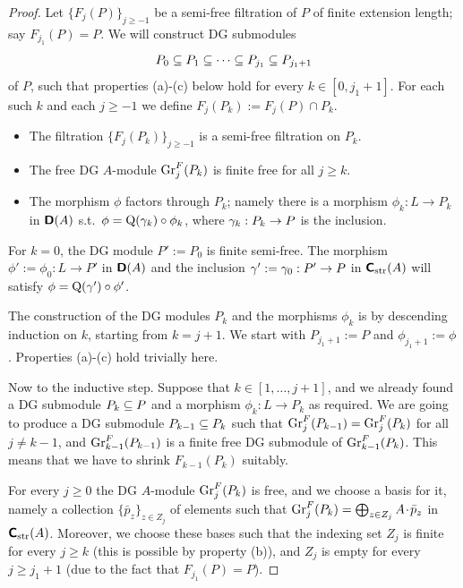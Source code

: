 \begin{proof}
Let $\{ F_j(P) \}_{j \geq -1}$ be a semi-free filtration of $P$ of finite 
extension length; say $F_{j_1}(P) = P$. We will construct DG submodules
\[ P_0 \subseteq P_1 \subseteq \cdots \subseteq P_{j_1} \subseteq P_{j_1 + 1} \]
of $P$, such that properties (a)-(c) below hold for every 
$k \in [0, j_1 + 1]$. For each such $k$ and each $j \geq -1$ we define  
$F_j(P_k) := F_j(P) \cap P_k$.
\begin{itemize}
\item[(a)] The filtration $\{ F_j(P_k) \}_{j \geq -1}$ is a semi-free 
filtration on $P_k$.

\item[(b)] The free DG $A$-module $\operatorname{Gr}^F_j(P_k)$ is finite free for all 
$j \geq k$. 

\item[(c)] The morphism $\phi$ factors through $P_k$; namely there is a 
morphism $\phi_k : L \to P_k$ in $\boldsymbol{\mathsf{D}}(A)$ s.t.\ 
$\phi = \operatorname{Q}(\gamma_k) \circ \phi_k$, where $\gamma_k : P_k \to P$ is the 
inclusion. 
\end{itemize}

For $k = 0$, the DG module $P' := P_0$ is finite semi-free. The morphism 
$\phi' := \phi_0 : L \to P'$
in $\boldsymbol{\mathsf{D}}(A)$ and the inclusion 
$\gamma' := \gamma_0 : P' \to P$
in $\boldsymbol{\mathsf{C}}_{\mathrm{str}}(A)$ 
will satisfy $\phi = \operatorname{Q}(\gamma') \circ \phi'$. 

The construction of the DG modules $P_k$ and the morphisms $\phi_k$ is by 
descending induction on $k$, starting from $k = j + 1$. 
We start with $P_{j_1 +1 } := P$ and $\phi_{j_1 + 1} := \phi$. 
Properties (a)-(c) hold trivially here. 

Now to the inductive step. Suppose that $k \in [1, \ldots, j + 1]$, 
and we already found a DG submodule 
$P_k \subseteq P$ and a morphism $\phi_k : L \to P_k$ as required. 
We are going to produce a DG submodule 
$P_{k - 1} \subseteq P_k$ such that 
$\operatorname{Gr}^F_{j}(P_{k - 1}) = \operatorname{Gr}^F_{j}(P_k)$
for all $j \neq k - 1$, and 
$\operatorname{Gr}^F_{k - 1}(P_{k - 1})$ is a finite free DG submodule of 
$\operatorname{Gr}^F_{k - 1}(P_k)$. 
This means that we have to shrink $F_{k - 1}(P_k)$ suitably.

For every $j \geq 0$ the DG $A$-module $\operatorname{Gr}^F_{j}(P_k)$ is free, and 
we choose a basis for it, namely a collection 
$\{ \bar{p}_z \}_{z \in Z_j}$
of elements such that 
$\operatorname{Gr}^F_{j}(P_k) = \bigoplus_{z \in Z_j} A \mspace{1.5mu}{\cdot}\mspace{1.5mu} \bar{p}_z$
in $\boldsymbol{\mathsf{C}}_{\mathrm{str}}(A)$. 
Moreover, we choose these bases such that the indexing set 
$Z_j$ is finite for every $j \geq k$ (this is possible by property (b)), 
and $Z_j$ is empty for every $j \geq j_1 + 1$ (due to the fact that 
$F_{j_1}(P) = P$). 


\end{proof}
